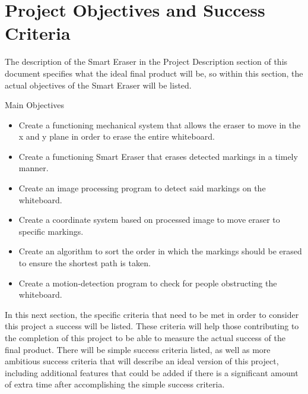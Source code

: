  \section{Project Objectives and Success Criteria}
 The description of the Smart Eraser in the Project Description section of this document specifies what the ideal final product will be, so within this section, the actual objectives of the Smart Eraser will be listed. \\ \par
 \setlength{\parindent}{2.5ex}  Main Objectives
 \begin{itemize}
 \item Create a functioning mechanical system that allows the eraser to move in the x and y plane in order to erase the entire whiteboard.
 \item Create a functioning Smart Eraser that erases detected markings in a timely manner.
 \item Create an image processing program to detect said markings on the whiteboard.
 \item Create a coordinate system based on processed image to move eraser to specific markings.
 \item Create an algorithm to sort the order in which the markings should be erased to ensure the shortest path is taken.
 \item Create a motion-detection program to check for people obstructing the whiteboard. \\
 \end{itemize} \par

\setlength{\parindent}{2.5ex} In this next section, the specific criteria that need to be met in order to consider this project a success will be listed. These criteria will help those contributing to the completion of this project to be able to measure the actual success of the final product. There will be simple success criteria listed, as well as more ambitious success criteria that will describe an ideal version of this project, including additional features that could be added if there is a significant amount of extra time after accomplishing the simple success criteria. \\

